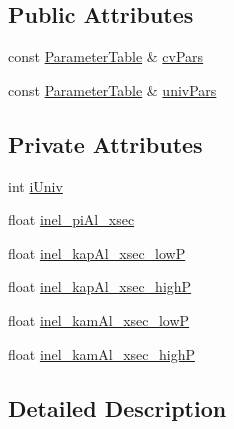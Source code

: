 \subsection*{Public Attributes}
\begin{DoxyCompactItemize}
\item 
const \hyperlink{class_neutrino_flux_reweight_1_1_parameter_table}{Parameter\-Table} \& \hyperlink{class_neutrino_flux_reweight_1_1_absorption_d_v_o_l_reweighter_a9eab93b31a22145ef9fa33a877dbf02e}{cv\-Pars}
\item 
const \hyperlink{class_neutrino_flux_reweight_1_1_parameter_table}{Parameter\-Table} \& \hyperlink{class_neutrino_flux_reweight_1_1_absorption_d_v_o_l_reweighter_a2bb54a2f64d4cc407e3afa5bf8c298e4}{univ\-Pars}
\end{DoxyCompactItemize}
\subsection*{Private Attributes}
\begin{DoxyCompactItemize}
\item 
int \hyperlink{class_neutrino_flux_reweight_1_1_absorption_d_v_o_l_reweighter_a9a086a16ffdb3431f69c980c4f80d0b4}{i\-Univ}
\item 
float \hyperlink{class_neutrino_flux_reweight_1_1_absorption_d_v_o_l_reweighter_ab70c49c8fc53548eed60cca86589ae98}{inel\-\_\-pi\-Al\-\_\-xsec}
\item 
float \hyperlink{class_neutrino_flux_reweight_1_1_absorption_d_v_o_l_reweighter_a2d57ad8d135f3874fe5636f9a30ceea1}{inel\-\_\-kap\-Al\-\_\-xsec\-\_\-low\-P}
\item 
float \hyperlink{class_neutrino_flux_reweight_1_1_absorption_d_v_o_l_reweighter_a980a548cffd4ca6fb3df8e146f11a30d}{inel\-\_\-kap\-Al\-\_\-xsec\-\_\-high\-P}
\item 
float \hyperlink{class_neutrino_flux_reweight_1_1_absorption_d_v_o_l_reweighter_aaed12a6a79b561923f5f426de474f006}{inel\-\_\-kam\-Al\-\_\-xsec\-\_\-low\-P}
\item 
float \hyperlink{class_neutrino_flux_reweight_1_1_absorption_d_v_o_l_reweighter_a75a48086a64722329b58cd1e099933c4}{inel\-\_\-kam\-Al\-\_\-xsec\-\_\-high\-P}
\end{DoxyCompactItemize}


\subsection{Detailed Description}


